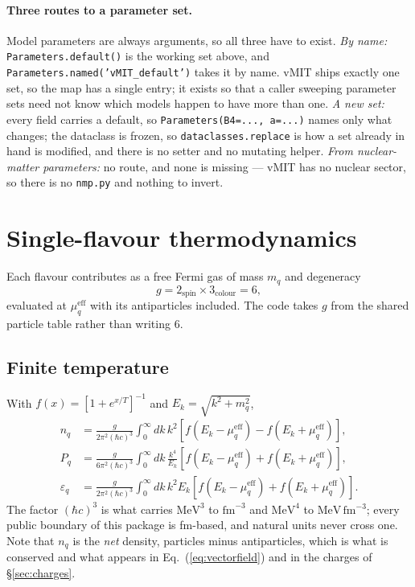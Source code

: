 \documentclass[aps,prc,onecolumn,superscriptaddress,nofootinbib,10pt]{revtex4-2}
\newcommand{\mueff}[1]{\mu^{\mathrm{eff}}_{#1}}
\newcommand{\hc}{(\hbar c)^3}
\begin{document}
\paragraph{Three routes to a parameter set.} Model parameters are always
arguments, so all three have to exist. \emph{By name:}
\texttt{Parameters.default()} is the working set above, and
\texttt{Parameters.named('vMIT\_default')} takes it by name. vMIT ships exactly
one set, so the map has a single entry; it exists so that a caller sweeping
parameter sets need not know which models happen to have more than one.
\emph{A new set:} every field carries a default, so
\texttt{Parameters(B4=..., a=...)} names only what changes; the dataclass is
frozen, so \texttt{dataclasses.replace} is how a set already in hand is
modified, and there is no setter and no mutating helper. \emph{From
nuclear-matter parameters:} no route, and none is missing --- vMIT has no
nuclear sector, so there is no \texttt{nmp.py} and nothing to invert.

\section{Single-flavour thermodynamics}
\label{sec:single}

Each flavour contributes as a free Fermi gas of mass $m_q$ and degeneracy
%
\begin{equation}
g = 2_{\mathrm{spin}} \times 3_{\mathrm{colour}} = 6 ,
\end{equation}
%
evaluated at $\mueff{q}$ with its antiparticles included. The code takes $g$
from the shared particle table rather than writing $6$.

\subsection{Finite temperature}

With $f(x) = [1 + e^{x/T}]^{-1}$ and $E_k = \sqrt{k^2 + m_q^2}$,
%
\begin{align}
n_q &= \frac{g}{2\pi^2 \hc} \int_0^\infty \! dk\, k^2
       \left[ f(E_k - \mueff{q}) - f(E_k + \mueff{q}) \right] ,
\label{eq:nq} \\
P_q &= \frac{g}{6\pi^2 \hc} \int_0^\infty \! dk\, \frac{k^4}{E_k}
       \left[ f(E_k - \mueff{q}) + f(E_k + \mueff{q}) \right] ,
\label{eq:Pq} \\
\varepsilon_q &= \frac{g}{2\pi^2 \hc} \int_0^\infty \! dk\, k^2 E_k
       \left[ f(E_k - \mueff{q}) + f(E_k + \mueff{q}) \right] .
\label{eq:epsq}
\end{align}
%
The factor $\hc$ is what carries $\mathrm{MeV}^3$ to $\mathrm{fm}^{-3}$ and
$\mathrm{MeV}^4$ to $\mathrm{MeV\,fm^{-3}}$; every public boundary of this
package is fm-based, and natural units never cross one. Note that $n_q$ is the
\emph{net} density, particles minus antiparticles, which is what is conserved
and what appears in Eq.~(\ref{eq:vectorfield}) and in the charges of
\S\ref{sec:charges}.
\end{document}

